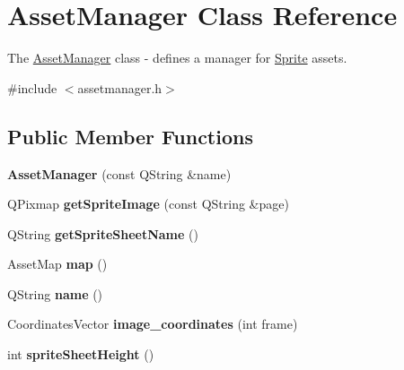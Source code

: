 \hypertarget{class_asset_manager}{}\section{Asset\+Manager Class Reference}
\label{class_asset_manager}


The \hyperlink{class_asset_manager}{Asset\+Manager} class -\/ defines a manager for \hyperlink{class_sprite}{Sprite} assets.  




{\ttfamily \#include $<$assetmanager.\+h$>$}

\subsection*{Public Member Functions}
\begin{DoxyCompactItemize}
\item 
\mbox{\label{class_asset_manager_af0306dd34eed25aba731bf54a2027193}} 
{\bfseries Asset\+Manager} (const Q\+String \&name)
\item 
\mbox{\label{class_asset_manager_abc08a58cf1fdb77b10e16128ec733c0a}} 
Q\+Pixmap {\bfseries get\+Sprite\+Image} (const Q\+String \&page)
\item 
\mbox{\label{class_asset_manager_ad40f4a2d968b74c85ba26a377496d0fa}} 
Q\+String {\bfseries get\+Sprite\+Sheet\+Name} ()
\item 
\mbox{\label{class_asset_manager_a5f5fa8d14fe3711777c83278765a20ff}} 
Asset\+Map {\bfseries map} ()
\item 
\mbox{\label{class_asset_manager_ae7b749953e6c088953213c3f32cbecee}} 
Q\+String {\bfseries name} ()
\item 
\mbox{\label{class_asset_manager_aebddd385e6cefa6f0e2f940816b57c67}} 
Coordinates\+Vector {\bfseries image\+\_\+coordinates} (int frame)
\item 
\mbox{\label{class_asset_manager_a73b932777ba2543f51304b7fda0b7d5e}} 
int {\bfseries sprite\+Sheet\+Height} ()
\item 
\mbox{\label{class_asset_manager_aa239ebd57768e3eee4422fd0fa75a405}} 

\end{DoxyCompactItemize}

